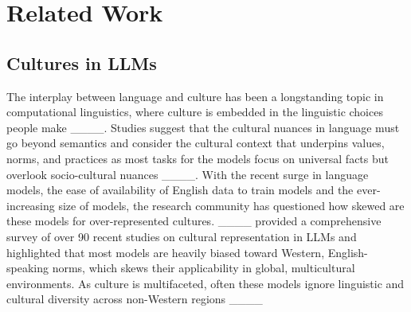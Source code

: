 \section{Related Work}

\subsection{Cultures in LLMs}
The interplay between language and culture has been a longstanding topic in computational linguistics, where culture is embedded in the linguistic choices people make ____. Studies suggest that the cultural nuances in language must go beyond semantics and consider the cultural context that underpins values, norms, and practices as most tasks for the models focus on universal facts but overlook socio-cultural nuances ____. With the recent surge in language models, the ease of availability of English data to train models and the ever-increasing size of models, the research community has questioned how skewed are these models for over-represented cultures. ____ provided a comprehensive survey of over 90 recent studies on cultural representation in LLMs and highlighted that most models are heavily biased toward Western, English-speaking norms, which skews their applicability in global, multicultural environments. As culture is multifaceted, often these models ignore linguistic and cultural diversity across non-Western regions ____
 
 

